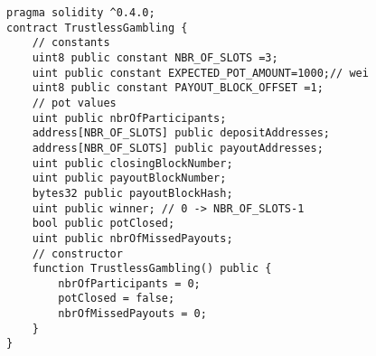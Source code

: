 \begin{lstlisting}[basicstyle=\small]
pragma solidity ^0.4.0;
contract TrustlessGambling {
    // constants
    uint8 public constant NBR_OF_SLOTS =3;
    uint public constant EXPECTED_POT_AMOUNT=1000;// wei
    uint8 public constant PAYOUT_BLOCK_OFFSET =1;    
    // pot values
    uint public nbrOfParticipants;
    address[NBR_OF_SLOTS] public depositAddresses;
    address[NBR_OF_SLOTS] public payoutAddresses;
    uint public closingBlockNumber;
    uint public payoutBlockNumber;
    bytes32 public payoutBlockHash;
    uint public winner; // 0 -> NBR_OF_SLOTS-1
    bool public potClosed;
    uint public nbrOfMissedPayouts;
    // constructor
    function TrustlessGambling() public {
        nbrOfParticipants = 0;
        potClosed = false;
        nbrOfMissedPayouts = 0;
    }
}
\end{lstlisting}

